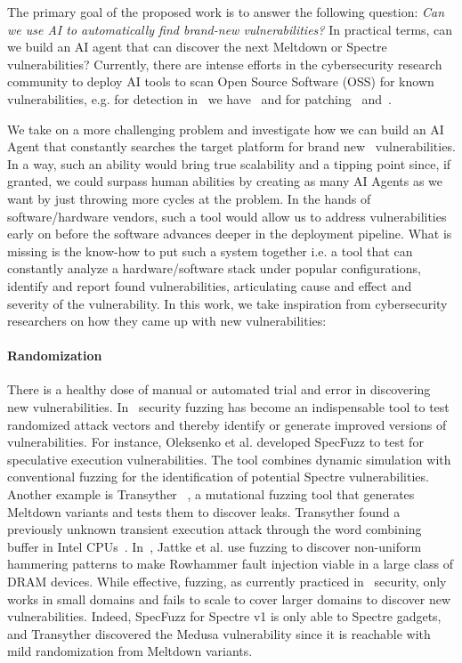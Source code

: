 The primary goal of the proposed work is to answer the following question: \textit{Can we use AI to automatically find brand-new vulnerabilities?}
%
In practical terms, can we build an AI agent that can discover the next Meltdown or Spectre vulnerabilities? Currently, there are intense efforts in the cybersecurity research community to deploy AI tools to scan Open Source Software (OSS) for known vulnerabilities, e.g. for detection in \Mi\ we have~\cite{doychev2015cacheaudit,jan2018microwalk,jan2022microwalk,cauligi2020constant,wang2019kleespectre,guarnieri2020spectector} and for patching~\cite{gupta2017deepfix,yasunaga2021break,tarlow2020learning,pearce2023examining,wu2023effective,garg2023rapgen} and~\cite{tol2023zeroleak}.

We take on a more challenging problem and investigate how we can build an AI Agent that constantly searches the target platform for brand new \Mi\ vulnerabilities. In a way, such an ability would bring true scalability and a tipping point since, if granted, we could surpass human abilities by creating as many AI Agents as we want by just throwing more cycles at the problem. In the hands of software/hardware vendors, such a tool would allow us to address vulnerabilities early on before the software advances deeper in the deployment pipeline. What is missing is the know-how to put such a system together i.e. a tool that can constantly analyze a hardware/software stack under popular configurations, identify and report found vulnerabilities, articulating cause and effect and severity of the vulnerability. In this work, we take inspiration from cybersecurity researchers on how they came up with new vulnerabilities:

\paragraph{Randomization} There is a healthy dose of manual or automated trial and error in discovering new vulnerabilities. In \Mi\, security fuzzing has become an indispensable tool to test randomized attack vectors and thereby identify or generate improved versions of vulnerabilities. For instance, Oleksenko et al.\cite{oleksenko2019specfuzz} developed SpecFuzz to test for speculative execution vulnerabilities. The tool combines dynamic simulation with conventional fuzzing for the identification of potential Spectre vulnerabilities. Another example is Transyther~\cite{moghimi2020medusa} , a mutational fuzzing tool that generates Meltdown variants and tests them to discover leaks. Transyther found a previously unknown transient execution attack through the word combining buffer in Intel CPUs~\cite{moghimi2020medusa}. In~\cite{jattke2022blacksmith}, Jattke et al. use fuzzing to discover non-uniform hammering patterns to make Rowhammer fault injection viable in a large class of DRAM devices. While effective, fuzzing, as currently practiced in \Mi\ security, only works in small domains and fails to scale to cover larger domains to discover new vulnerabilities. Indeed, SpecFuzz for Spectre v1 is only able to Spectre gadgets, and Transyther discovered the Medusa vulnerability since it is reachable with mild randomization from Meltdown variants. 


